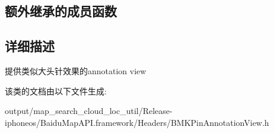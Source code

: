 \subsection*{额外继承的成员函数}


\subsection{详细描述}
提供类似大头针效果的annotation view 

该类的文档由以下文件生成\+:\begin{DoxyCompactItemize}
\item 
output/map\+\_\+search\+\_\+cloud\+\_\+loc\+\_\+util/\+Release-\/iphoneos/\+Baidu\+Map\+A\+P\+I.\+framework/\+Headers/B\+M\+K\+Pin\+Annotation\+View.\+h\end{DoxyCompactItemize}
